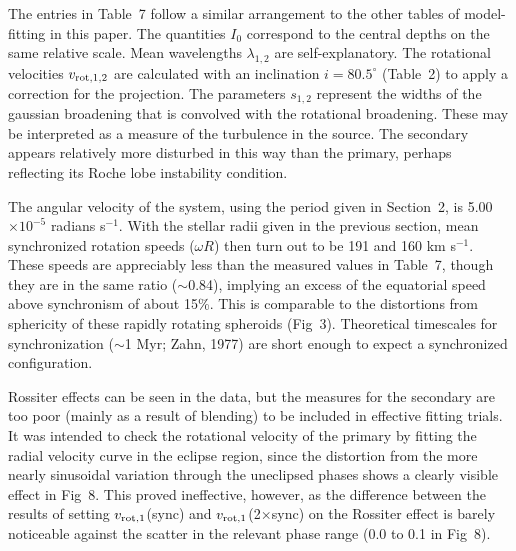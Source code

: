 \documentclass[useAMS,usenatbib]{mnras}                                                                           \usepackage[pdftex]{graphicx}
\begin{document}
 The entries in Table~7 follow a similar arrangement to the other tables
 of model-fitting in this paper.
 The quantities $I_0$ correspond to the central depths on the same relative scale. 
 Mean wavelengths $\lambda_{1,2}$ are self-explanatory.
 The rotational velocities $v_{\rm rot, 1,2}$  are calculated with an
 inclination $i = 80.5^{\circ}$ (Table~2) to apply a correction for the projection.
The parameters $s_{1,2}$ represent the widths of the gaussian broadening
that is convolved with the rotational broadening.  These may be interpreted
as a measure of the turbulence in the source.  The secondary appears 
relatively more disturbed in this way than the primary, perhaps
reflecting its Roche lobe instability condition.
 
 The angular velocity of the system, using the period given in Section~2, is
 5.00$\times 10^{-5}$ radians s$^{-1}$.  With the stellar radii 
 given in the previous section, mean synchronized rotation speeds ($\omega R$)
 then turn out to be 191 and 160 km s$^{-1}$. 
These speeds are appreciably less than the measured values in Table~7,
though they are in the same ratio ($\sim$0.84), implying an
 excess of the equatorial speed above synchronism of about 15\%.  This
is comparable to the distortions from sphericity  of these rapidly rotating spheroids
(Fig~3).  Theoretical timescales for synchronization ($\sim$1 Myr; Zahn, 1977) 
 are short enough to expect a synchronized configuration.  

Rossiter effects can be seen in the data, but the measures for the secondary are
too poor (mainly as a result of blending) to be included in effective fitting trials.
It was intended to check the rotational velocity of the primary by
fitting the radial velocity curve in the eclipse region, since the
distortion from the more nearly sinusoidal variation through the 
uneclipsed phases shows a clearly visible effect in Fig~8.
This proved ineffective, however, as the difference between the results of setting
$v_{{\rm rot},1}$(sync) and $v_{{\rm rot},1}$(2$\times$sync) on the Rossiter effect
is barely noticeable against the scatter in the relevant phase range (0.0 to 0.1 in Fig~8).
\end{document}
